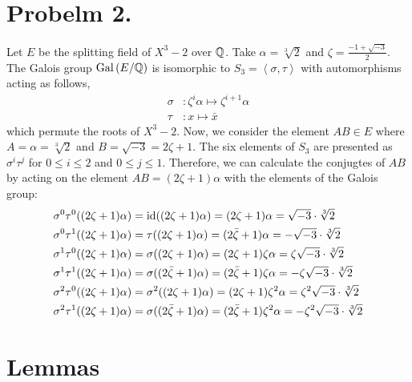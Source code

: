 \documentclass[12pt]{extarticle}
\begin{document}
\section*{Probelm 2.}
Let $E$ be the splitting field of $X^3 - 2$ over $\mathbb{Q}$. Take $\alpha = \sqrt[3]{2}$ and $\zeta = \frac{-1 + \sqrt{-3}}{2}$. The Galois group $\mathrm{Gal}\left( E/\mathbb{Q} \right)$ is isomorphic to $S_3 = \left< \sigma, \tau \right>$ with automorphisms acting as follows,
\begin{align*}
\sigma & : \zeta^i \alpha \mapsto \zeta^{i + 1} \alpha \\
\tau & : x \mapsto \bar{x}
\end{align*} 
which permute the roots of $X^3 - 2$. Now, we consider the element $AB \in E$ where $A = \alpha = \sqrt[3]{2}$ and $B = \sqrt{-3} = 2 \zeta + 1$. The six elements of $S_3$ are presented as $\sigma^i \tau^j$ for $0 \le i \le 2$ and $0 \le j \le 1$. Therefore, we can calculate the conjugtes of $AB$ by acting on the element $AB = (2 \zeta + 1)\alpha$ with the elements of the Galois group:
\begin{align*}
\sigma^0 \tau^0 ((2 \zeta + 1)\alpha) &= \mathrm{id}((2 \zeta + 1)\alpha) = (2 \zeta + 1)\alpha = \sqrt{-3} \cdot \sqrt[3]{2} \\
\sigma^0 \tau^1 ((2 \zeta + 1)\alpha) &= \tau((2 \zeta + 1)\alpha) = (2 \bar{\zeta} + 1)\alpha = - \sqrt{-3} \cdot \sqrt[3]{2} \\
\sigma^1 \tau^0 ((2 \zeta + 1)\alpha) &= \sigma((2 \zeta + 1)\alpha) = (2 \zeta + 1)\zeta \alpha = \zeta \sqrt{-3} \cdot \sqrt[3]{2} \\
\sigma^1 \tau^1 ((2 \zeta + 1)\alpha) &= \sigma((2 \bar{\zeta} + 1)\alpha) = (2 \bar{\zeta} + 1) \zeta \alpha = - \zeta \sqrt{-3} \cdot \sqrt[3]{2} \\
\sigma^2 \tau^0 ((2 \zeta + 1)\alpha) &= \sigma^2((2 \zeta + 1)\alpha) = (2 \zeta + 1) \zeta^2 \alpha = \zeta^2 \sqrt{-3} \cdot \sqrt[3]{2} \\
\sigma^2 \tau^1 ((2 \zeta + 1)\alpha) &= \sigma((2 \bar{\zeta} + 1)\alpha) = (2 \bar{\zeta} + 1) \zeta^2 \alpha = - \zeta^2 \sqrt{-3} \cdot \sqrt[3]{2} \\
\end{align*}

\section*{Lemmas}
\end{document}
